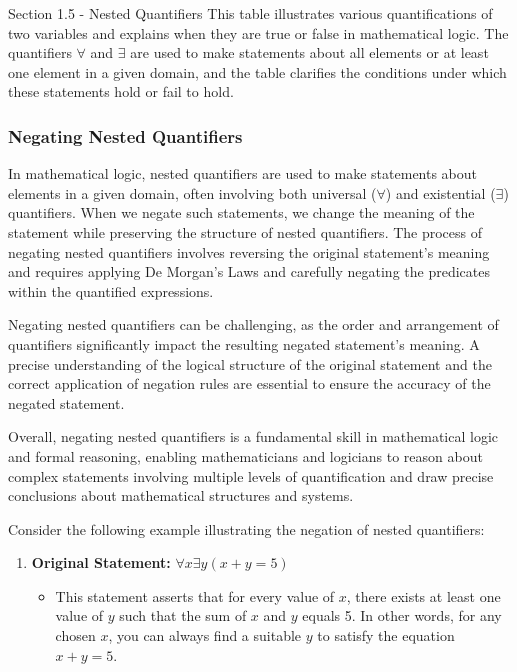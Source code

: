 \begin{notes}{Section 1.5 - Nested Quantifiers}
    This table illustrates various quantifications of two variables and explains when they are true or false in mathematical logic. The quantifiers \(\forall\) and \(\exists\) are used to make statements about all elements or at least one element in a given domain, 
    and the table clarifies the conditions under which these statements hold or fail to hold.

    \subsubsection*{Negating Nested Quantifiers}

    In mathematical logic, nested quantifiers are used to make statements about elements in a given domain, often involving both universal (\(\forall\)) and existential (\(\exists\)) quantifiers. When we negate such statements, we change the meaning of the statement 
    while preserving the structure of nested quantifiers. The process of negating nested quantifiers involves reversing the original statement's meaning and requires applying De Morgan's Laws and carefully negating the predicates within the quantified expressions.
    
    Negating nested quantifiers can be challenging, as the order and arrangement of quantifiers significantly impact the resulting negated statement's meaning. A precise understanding of the logical structure of the original statement and the correct application of 
    negation rules are essential to ensure the accuracy of the negated statement.
    
    Overall, negating nested quantifiers is a fundamental skill in mathematical logic and formal reasoning, enabling mathematicians and logicians to reason about complex statements involving multiple levels of quantification and draw precise conclusions about 
    mathematical structures and systems.

    \begin{Highlight}
        Consider the following example illustrating the negation of nested quantifiers:
    
        \begin{enumerate}
            \item \textbf{Original Statement:} \(\forall x \exists y (x + y = 5)\)
            \begin{itemize}
                \item This statement asserts that for every value of \(x\), there exists at least one value of \(y\) such that the sum of \(x\) and \(y\) equals 5. In other words, for any chosen \(x\), you can always find a suitable \(y\) to satisfy the equation \(x + y = 5\).
            \end{itemize}
    

\end{enumerate}
\end{Highlight}
\end{notes}
